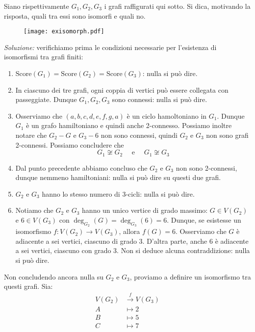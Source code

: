 \newpage
\begin{tcolorbox}[enhanced, breakable, colback=blue!30, colframe=blue!30!black, title=Esempio]
Siano rispettivamente $G_1, G_2, G_3$ i grafi raffigurati qui sotto.
Si dica, motivando la risposta, quali tra essi sono isomorfi e quali no.
\begin{figure}[H]
\centering
\texttt{[image: exisomorph.pdf]}
\end{figure}
\textit{Soluzione:} verifichiamo prima le condizioni necessarie per l'esistenza
di isomorfismi tra grafi finiti:
\begin{enumerate}
    \item $\text{Score}(G_1) = \text{Score}(G_2) = \text{Score}(G_3)$: nulla si può dire.
    \item In ciascuno dei tre grafi, ogni coppia di vertici può essere collegata con passeggiate. Dunque $G_1,G_2,G_3$ sono connessi: nulla si può dire.
    \item Osserviamo che $(a,b,c,d,e,f,g,a)$ è un ciclo hamoltoniano in $G_1$.
    Dunque $G_1$ è un grafo hamiltoniano e quindi anche 2-connesso. Possiamo inoltre
    notare che $G_2 - G$ e $G_3 - 6$ non sono connessi, quindi $G_2$ e $G_3$ non
    sono grafi 2-connessi. Possiamo concludere che
    \[ G_1 \not\cong G_2 \quad \text{ e } \quad G_1 \not\cong G_3 \]
    \item Dal punto precedente abbiamo concluso che $G_2$ e $G_3$ non sono 2-connessi,
    dunque nemmeno hamiltoniani: nulla si può dire su questi due grafi.
    \item $G_2$ e $G_3$ hanno lo stesso numero di 3-cicli: nulla si può dire.
    \item Notiamo che $G_2$ e $G_3$ hanno un unico vertice di grado massimo:
    $G\in V(G_2)$ e $6 \in V(G_3)$ con $\deg_{G_2}(G) = \deg_{G_3}(6) = 6$.
    Dunque, se esistesse un isomorfismo $f:V(G_2)\to V(G_3)$, allora $f(G) = 6$.
    Osserviamo che $G$ è adiacente a sei vertici, ciascuno di grado 3. D'altra parte,
    anche $6$ è adiacente a sei vertici, ciascuno con grado 3. Non si deduce alcuna
    contraddizione: nulla si può dire.
\end{enumerate}
Non concludendo ancora nulla su $G_2$ e $G_3$, proviamo a definire un isomorfismo
tra questi grafi. Sia:
\begin{align*}
    V(G_2) &\stackrel{f}{\to} V(G_3)\\
    A&\mapsto 2\\
    B&\mapsto 5\\
    C&\mapsto 7\\

\end{align*}
\end{tcolorbox}
